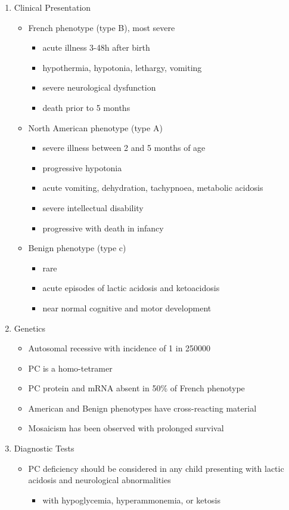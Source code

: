 \documentclass{scrartcl}
\begin{document}
\begin{enumerate}
\item Clinical Presentation
\label{sec:org6175f77}
\begin{itemize}
\item French phenotype (type B), most severe
\begin{itemize}
\item acute illness 3-48h after birth
\item hypothermia, hypotonia, lethargy, vomiting
\item severe neurological dysfunction
\item death prior to 5 months
\end{itemize}
\item North American phenotype (type A)
\begin{itemize}
\item severe illness between 2 and 5 months of age
\item progressive hypotonia
\item acute vomiting, dehydration, tachypnoea, metabolic acidosis
\item severe intellectual disability
\item progressive with death in infancy
\end{itemize}
\item Benign phenotype (type c)
\begin{itemize}
\item rare
\item acute episodes of lactic acidosis and ketoacidosis
\item near normal cognitive and motor development
\end{itemize}
\end{itemize}
\item Genetics
\label{sec:orgea6af12}
\begin{itemize}
\item Autosomal recessive with incidence of 1 in 250000
\item PC is a homo-tetramer
\item PC protein and mRNA absent in 50\% of French phenotype
\item American and Benign phenotypes have cross-reacting material
\item Mosaicism has been observed with prolonged survival
\end{itemize}

\item Diagnostic Tests
\label{sec:orga017c61}
\begin{itemize}
\item PC deficiency should be considered in any child presenting with
lactic acidosis and neurological abnormalities
\begin{itemize}
\item with hypoglycemia, hyperammonemia, or ketosis
\end{itemize}


\end{itemize}
\end{enumerate}
\end{document}
